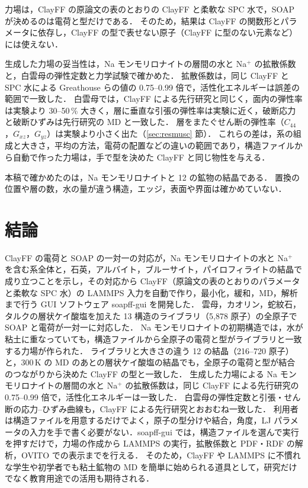 \documentclass[a4paper,11pt]{article}
\begin{document}
力場は，ClayFF の原論文の表のとおりの ClayFF と柔軟な SPC 水で，SOAP が決めるのは電荷と型だけである．
そのため，結果は ClayFF の関数形とパラメータに依存し，ClayFF の型で表せない原子（ClayFF に型のない元素など）には使えない．

生成した力場の妥当性は，Na モンモリロナイトの層間の水と Na$^+$ の拡散係数と，白雲母の弾性定数と力学試験で確かめた．
拡散係数は，同じ ClayFF と SPC 水による Greathouse ら\cite{greathouse2016}の値の 0.75--0.99 倍で，活性化エネルギーは誤差の範囲で一致した．
白雲母では，ClayFF による先行研究\cite{teich2012,delrio2026}と同じく，面内の弾性率は実験より 30--50\,\% 大きく，層に垂直な引張の弾性率は実験に近く，破断応力と破断ひずみは先行研究の MD と一致した．
層をまたぐせん断の弾性率（$C_{44}$，$G_{xz}$，$G_{yz}$）は実験より小さく出た（\ref{sec:resmusc} 節）．
これらの差は，系の組成と大きさ，平均の方法，電荷の配置などの違いの範囲であり，構造ファイルから自動で作った力場は，手で型を決めた ClayFF と同じ物性を与える．

本稿で確かめたのは，Na モンモリロナイトと 12 の鉱物の結晶である．
置換の位置や層の数，水の量が違う構造，エッジ，表面や界面は確かめていない．

\section{結論}
ClayFF の電荷と SOAP の一対一の対応が，Na モンモリロナイトの水と Na$^+$ を含む系全体と，石英，アルバイト，ブルーサイト，パイロフィライトの結晶で成り立つことを示し，その対応から ClayFF（原論文の表のとおりのパラメータと柔軟な SPC 水）の LAMMPS 入力を自動で作り，最小化，緩和，MD，解析まで行う GUI ソフトウェア soapff-gui を開発した．
雲母，カオリン，蛇紋石，タルクの層状ケイ酸塩を加えた 13 構造のライブラリ（5{,}878 原子）の全原子で SOAP と電荷が一対一に対応した．
Na モンモリロナイトの初期構造では，水が粘土に重なっていても，構造ファイルから全原子の電荷と型がライブラリと一致する力場が作られた．
ライブラリと大きさの違う 12 の結晶（216--720 原子）と，300\,K の MD のあとの層状ケイ酸塩の結晶でも，全原子の電荷と型が結合のつながりから決めた ClayFF の型と一致した．
生成した力場による Na モンモリロナイトの層間の水と Na$^+$ の拡散係数は，同じ ClayFF による先行研究の 0.75--0.99 倍で，活性化エネルギーは一致した．
白雲母の弾性定数と引張・せん断の応力--ひずみ曲線も，ClayFF による先行研究とおおむね一致した．
利用者は構造ファイルを用意するだけでよく，原子の型分けや結合，角度，LJ パラメータの入力を手で書く必要がない．soapff-gui では，構造ファイルを選んで実行を押すだけで，力場の作成から LAMMPS の実行，拡散係数と PDF・RDF の解析，OVITO での表示までを行える．
そのため，ClayFF や LAMMPS に不慣れな学生や初学者でも粘土鉱物の MD を簡単に始められる道具として，研究だけでなく教育用途での活用も期待される．
\end{document}
